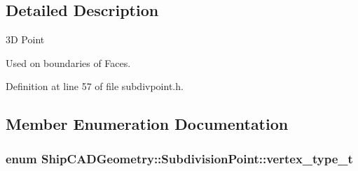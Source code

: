 \subsection{Detailed Description}
3\-D Point 

Used on boundaries of Faces. 

Definition at line 57 of file subdivpoint.\-h.



\subsection{Member Enumeration Documentation}
\hypertarget{classShipCADGeometry_1_1SubdivisionPoint_a03df9289cd8543cd3a567fa6c8e44c43}{
\subsubsection[{vertex\-\_\-type\-\_\-t}]{\setlength{\rightskip}{0pt plus 5cm}enum {\bf Ship\-C\-A\-D\-Geometry\-::\-Subdivision\-Point\-::vertex\-\_\-type\-\_\-t}}}\label{classShipCADGeometry_1_1SubdivisionPoint_a03df9289cd8543cd3a567fa6c8e44c43}
